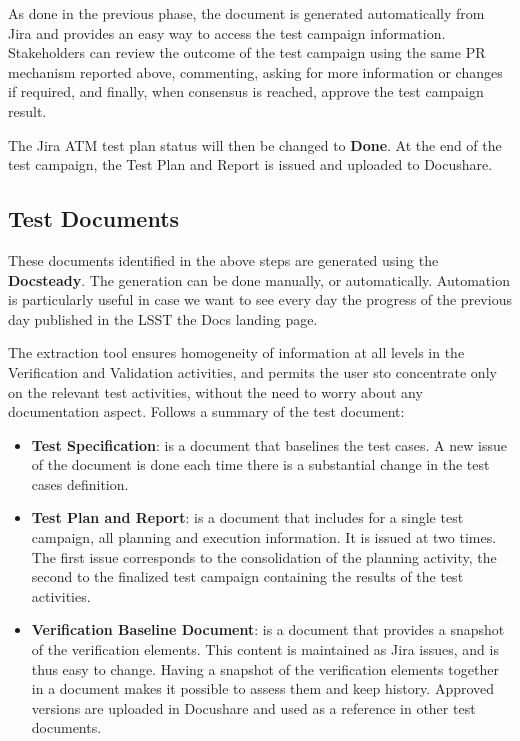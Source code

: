 As done in the previous phase, the document is generated automatically from Jira and provides an easy way to access the test campaign information.
Stakeholders can review the outcome of the test campaign using the same PR mechanism reported above, 
commenting, asking for more information or changes if required, and finally, when consensus is reached, approve the test campaign result.

The Jira ATM test plan status will then be changed to \textbf{Done}.
At the end of the test campaign, the Test Plan and Report is issued and uploaded to Docushare.


\subsection{Test Documents}

These documents identified in the above steps are generated using the \textbf{Docsteady}.
The generation can be done manually, or automatically.
Automation is particularly useful in case we want to see every day the progress of the previous day published in the LSST the Docs landing page.

The extraction tool ensures homogeneity of information at all levels in the Verification and Validation activities, 
and permits the user sto concentrate only on the relevant test activities, without the need to worry about any documentation aspect.
Follows a summary of the test document:

\begin{itemize}
\item \textbf{Test Specification}: is a document that baselines the test cases. 
A new issue of the document is done each time there is a substantial change in the test cases definition.
\item \textbf{Test Plan and Report}: is a document that includes for a single test campaign, all planning and execution information. 
It  is issued at two times. The first issue corresponds to the consolidation of the planning activity,  
the second to the finalized test campaign containing the results of the test activities.
\item \textbf{Verification Baseline Document}: is a document that provides a snapshot of the verification elements. 
This content is maintained as Jira issues, and is thus easy to change.
Having a snapshot of the verification elements together in a document makes it possible to assess them and keep history.
Approved versions are uploaded in Docushare and used as a reference in other test documents.
\end{itemize}

